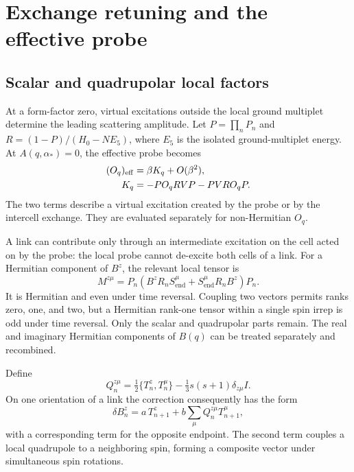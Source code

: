 \section{Exchange retuning and the effective probe}

\subsection{Scalar and quadrupolar local factors}

At a form-factor zero, virtual excitations outside the local ground
multiplet determine the leading scattering amplitude. Let $P=\prod_n P_n$
and $R=(1-P)/(H_0-NE_5)$, where $E_5$ is the isolated ground-multiplet
energy. At $A(q,\alpha_*)=0$, the effective probe becomes
\begin{align}
 (O_q)_{\mathrm{eff}}&=\beta K_q+O(\beta^2),\notag\\
 K_q&=-P O_q R V P-P V R O_q P.
 \label{eq:rank-probe}
\end{align}
The two terms describe a virtual excitation created by the probe or by
the intercell exchange. They are evaluated separately for non-Hermitian $O_q$.

A link can contribute only through an intermediate excitation on the cell
acted on by the probe: the local probe cannot de-excite both cells of a link.
For a Hermitian component of $B^z$, the relevant local tensor is
\begin{equation}
 M^{z\mu}=P_n(B^z R_n S_{\mathrm{end}}^\mu
                   +S_{\mathrm{end}}^\mu R_n B^z)P_n.
 \label{eq:rank-local-tensor}
\end{equation}
It is Hermitian and even under time reversal. Coupling two vectors permits
ranks zero, one, and two, but a Hermitian rank-one tensor within a single
spin irrep is odd under time reversal. Only the scalar and quadrupolar parts
remain. The real and imaginary Hermitian components of $B(q)$ can be treated
separately and recombined.

Define
\begin{equation}
 Q_n^{z\mu}=\tfrac12\{T_n^z,T_n^\mu\}
        -\tfrac13 s(s+1)\delta_{z\mu}I.
\end{equation}
On one orientation of a link the correction consequently has the form
\begin{equation}
 \delta B_n^z=a\,T_{n+1}^z
       +b\sum_\mu Q_n^{z\mu}T_{n+1}^\mu,
 \label{eq:rank-link}
\end{equation}
with a corresponding term for the opposite endpoint.
The second term couples a local quadrupole to a neighboring spin,
forming a composite vector under simultaneous spin rotations.

